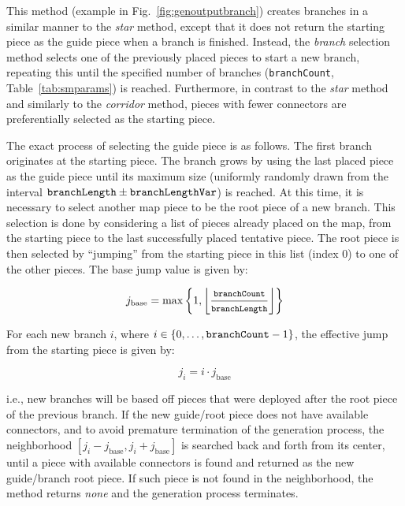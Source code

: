 \documentclass[journal]{IEEEtran}
\begin{document}
This method (example in Fig.~\ref{fig:genoutputbranch}) creates branches in a similar manner
to the \emph{star} method, except that it does not return the
starting piece as the guide piece when a branch is finished. Instead, the \emph{branch}
selection method selects one of the previously placed pieces to start a new branch,
repeating this until the specified number of branches (\texttt{branchCount},
Table~\ref{tab:smparams}) is reached. Furthermore, in contrast to the \emph{star} method
and similarly to the \emph{corridor} method, pieces with fewer connectors are
preferentially selected as the starting piece.

The exact process of selecting the guide piece is as follows. The first branch originates
at the starting piece. The branch grows by using the last placed piece as the guide piece
until its maximum size (uniformly randomly drawn from the interval $\text{\texttt{branchLength}}
\pm \text{\texttt{branchLengthVar}}$) is reached. At this time, it is necessary to select
another map piece to be the root piece of a new branch. This selection is done by considering
a list of pieces already placed on the map, from the starting piece to the last successfully
placed tentative piece. The root piece is then selected by ``jumping'' from the starting
piece in this list (index 0) to one of the other pieces. The base jump value is given by:

\begin{equation*}
  j_\text{base}=\max\left\{1,\left\lfloor\frac{\texttt{\footnotesize{branchCount}}}{\texttt{\footnotesize{branchLength}}}\right\rfloor\right\}
\end{equation*}

\noindent For each new branch $i$, where $i \in \{0, \dots, \text{\texttt{branchCount}}-1\}$, the
effective jump from the starting piece is given by:

\begin{equation*}
  j_i=i \cdot j_\text{base}
\end{equation*}

\noindent i.e., new branches will be based off pieces that were deployed after the root
piece of the previous branch. If the new guide/root piece does not have available connectors,
and to avoid premature termination of the generation process, the neighborhood
$[j_i-j_\text{base},j_i+j_\text{base}]$ is searched back and forth from its center, until
a piece with available connectors is found and returned as the new guide/branch root piece.
If such piece is not found in the neighborhood, the method returns \textit{none} and the
generation process terminates.
\end{document}
